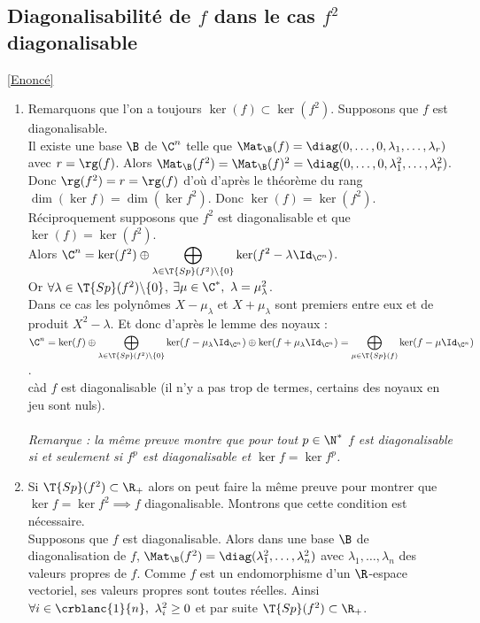 \documentclass[8pt]{book}
\begin{document}
	\subsection{Diagonalisabilité de $f$ dans le cas $f^2$ diagonalisable }
	\label{Diagonalisabilité de f dans le cas f^2 diagonalisable corrigé}
	\textcolor{blue}{\hyperref[Diagonalisabilité de f dans le cas f^2 diagonalisable]{[Enoncé]}}\\
	\begin{enumerate}[leftmargin=*]
		\item Remarquons que l'on a toujours $\ker(f)\subset \ker(f^2)$.
		Supposons que $f$ est diagonalisable.\\
		Il existe une base $\B$ de $\C^n$ telle que $\Mat_\B(f)=\diag(0,\dots,0,\lambda_1,\dots,\lambda_r)$ avec $r=\rg(f)$. Alors $\Mat_\B(f^2)=\Mat_\B(f)^2=\diag(0,\dots,0,\lambda_1^2,\dots,\lambda_r^2)$. Donc $\rg(f^2)=r=\rg(f)$ d'où d'après le théorème du rang $\dim(\ker f)=\dim(\ker f^2)$. Donc $\ker(f)=\ker(f^2)$.\\
		Réciproquement supposons que $f^2$ est diagonalisable et que $\ker(f)=\ker(f^2)$.\\
		Alors $\C^n=\ker(f^2)\oplus\displaystyle\bigoplus_{\lambda\in \T{Sp}(f^2)\backslash\{0\}}\ker(f^2-\lambda\Id_{\C^n})$.\\
		Or $\forall \lambda\in \T{Sp}(f^2)\backslash\{0\}$, $\exists \mu\in \C^*,\ \lambda=\mu_\lambda^2$.\\
		Dans ce cas les polynômes $X-\mu_\lambda$ et $X+\mu_\lambda$ sont premiers entre eux et de produit $X^2-\lambda$. Et donc d'après le lemme des noyaux :\\
		$\C^n=\ker(f)\oplus\displaystyle\bigoplus_{\lambda\in \T{Sp}(f^2)\backslash\{0\}}\ker(f-\mu_\lambda\Id_{\C^n})\oplus\ker(f+\mu_\lambda\Id_{\C^n})=\bigoplus_{\mu\in \T{Sp}(f)}\ker(f-\mu\Id_{\C^n})$.\\
		càd $f$ est diagonalisable (il n'y a pas trop de termes, certains des noyaux en jeu sont nuls).\\\\
		\textit{Remarque : la même preuve montre que pour tout $p\in \N^*$ $f$ est diagonalisable si et seulement si $f^p$ est diagonalisable et $\ker f=\ker f^p$.}
		\item Si $\T{Sp}(f^2)\subset \R_+$ alors on peut faire la même preuve pour montrer que $\ker f=\ker f^2\implies f$ diagonalisable. Montrons que cette condition est nécessaire.\\
		Supposons que $f$ est diagonalisable. Alors dans une base $\B$ de diagonalisation de $f$, $\Mat_\B(f^2)=\diag(\lambda_1^2,\dots,\lambda_n^2)$ avec $\lambda_1,\dots,\lambda_n$ des valeurs propres de $f$. Comme $f$ est un endomorphisme d'un $\R$-espace vectoriel, ses valeurs propres sont toutes réelles. Ainsi $\forall i\in \crblanc{1}{n},\ \lambda_i^2\geq 0$ et par suite $\T{Sp}(f^2)\subset \R_+$.

\end{enumerate}
\end{document}
